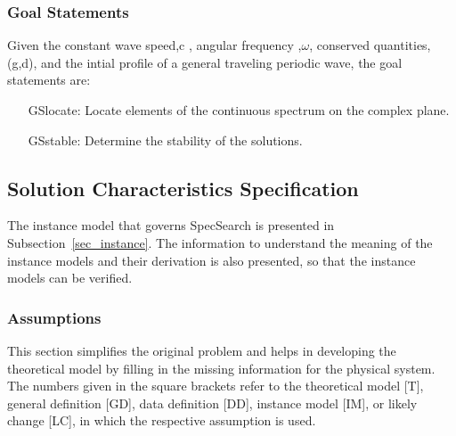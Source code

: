 \documentclass[12pt]{article}
\begin{document}
\subsubsection{Goal Statements}

\noindent Given the constant wave speed,c , angular frequency ,$\omega$, 
conserved quantities, (g,d), and the intial  profile of a general traveling 
periodic wave, the goal statements are: 

\begin{itemize}[leftmargin=.75in]

\item[GSlocate:] {Locate elements of the continuous spectrum on the 
complex plane. }

\item[GSstable:] {Determine the stability of the solutions.}

\end{itemize}


\subsection{Solution Characteristics Specification}

The instance model that governs SpecSearch is presented in
Subsection~\ref{sec_instance}.  The information to understand the meaning of the
instance models and their derivation is also presented, so that the instance
models can be verified.

\subsubsection{Assumptions}

This section simplifies the original problem and helps in developing the
theoretical model by filling in the missing information for the physical
system. The numbers given in the square brackets refer to the theoretical model
[T], general definition [GD], data definition [DD], instance model [IM], or
likely change [LC], in which the respective assumption is used.
\end{document}

